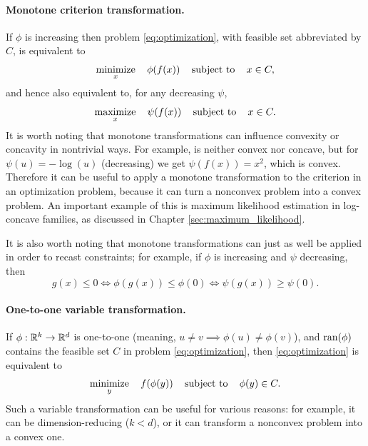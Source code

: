 \paragraph{Monotone criterion transformation.} 

If $\phi$ is increasing then problem \eqref{eq:optimization}, with feasible set
abbreviated by $C$, is equivalent to 
\[
\operatorname*{minimize}_x \quad \phi(f(x)) \quad \operatorname{subject\,\,to} \quad x \in C,
\]
and hence also equivalent to, for any decreasing $\psi$,
\[
\operatorname*{maximize}_x \quad \psi(f(x)) \quad \operatorname{subject\,\,to} \quad x \in C.
\]
It is worth noting that monotone transformations can influence convexity or
concavity in nontrivial ways. For example,  is neither
convex nor concave, but for $\psi(u) = -\log(u)$ (decreasing) we get $\psi(f(x))
= x^2$, which is convex. Therefore it can be useful to apply a monotone
transformation to the criterion in an optimization problem, because it can turn
a nonconvex problem into a convex problem. An important example of this is
maximum likelihood estimation in log-concave families, as discussed in Chapter 
\ref{sec:maximum_likelihood}. 

It is also worth noting that monotone transformations can just as well be
applied in order to recast constraints; for example, if $\phi$ is increasing and
$\psi$ decreasing, then 
\[
g(x) \leq 0 \iff \phi(g(x)) \leq \phi(0) \iff \psi(g(x)) \geq \psi(0).
\]

\paragraph{One-to-one variable transformation.} 

If $\phi : \mathbb{R}^k \to \mathbb{R}^d$ is one-to-one (meaning, $u \not= v \implies \phi(u)
\not= \phi(v)$), and $\operatorname{ran}(\phi)$ contains the feasible set $C$ in problem
\eqref{eq:optimization}, then \eqref{eq:optimization} is equivalent to   
\[
\operatorname*{minimize}_y \quad f(\phi(y)) \quad \operatorname{subject\,\,to} \quad \phi(y) \in C. 
\]
Such a variable transformation can be useful for various reasons: for example,
it can be dimension-reducing ($k < d$), or it can transform a nonconvex problem
into a convex one.  

